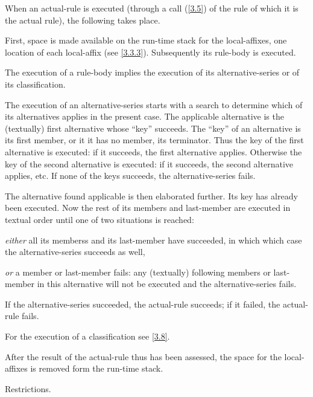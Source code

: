 \documentclass{article}
\newcommand\g[1]{{\sf #1}}
\begin{document}
When an \g{actual-rule} is executed (through a call (\ref{3.5}) of the \g{rule}
of which it is the \g{actual rule}), the following takes place.

First, space is made available on the run-time stack for the 
\g{local-affix}es, one location of each \g{local-affix} (see \ref{3.3.3}). Subsequently its
\g{rule-body} is executed.

The execution of a \g{rule-body} implies the execution of its
\g{alternative-series} or of its \g{classification}.

The execution of an \g{alternative-series} starts with a search to determine
which of its \g{alternative}s applies in the present case. The applicable
\g{alternative} is the (textually) first \g{alternative} whose ``key''
succeeds. The ``key'' of  an \g{alternative} is its first
\g{member}, or it it has no \g{member}, its \g{terminator}.
Thus the key of the first
\g{alternative} is executed: if it succeeds, the first \g{alternative}
applies. Otherwise the key of the second \g{alternative} is
executed: if it succeeds, the second \g{alternative} applies, etc. If none
of the keys succeeds, the \g{alternative-series} fails.

The \g{alternative} found applicable is then elaborated further. Its key 
has already been executed. Now the rest of its \g{member}s and
\g{last-member} are
executed in textual order until one of two situations is reached:

\emph{either} all its \g{members}s and its \g{last-member} have succeeded, in which which case the
\g{alternative-series} succeeds as well,

\emph{or} a member or \g{last-member} fails: any (textually) following \g{member}s 
or \g{last-member} in this
\g{alternative} will not be executed and the \g{alternative-series} fails.

If the \g{alternative-series} succeeded, the \g{actual-rule} succeeds; if
it failed, the \g{actual-rule} fails.

For the execution of a \g{classification} see \ref{3.8}.

After the result of the \g{actual-rule} thus has been assessed, the
space for the \g{local-affix}es is removed form the run-time stack.

\smallskip\noindent
Restrictions.
\end{document}
